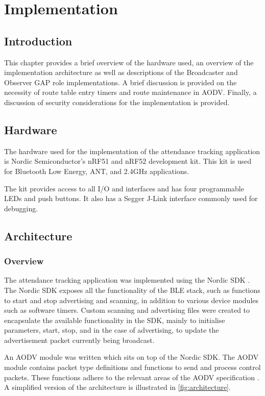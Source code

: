 \chapter{Implementation}

    \section{Introduction}
    This chapter provides a brief overview of the hardware used, an overview of
    the implementation architecture as well as descriptions of the Broadcaster
    and Observer GAP role implementations. A brief discussion is provided on the
    necessity of route table entry timers and route maintenance in AODV. Finally,
    a discussion of security considerations for the implementation is provided.

    \section{Hardware}
    The hardware used for the implementation of the attendance tracking application
    is Nordic Semiconductor's nRF51 and nRF52 development kit. This kit is used
    for Bluetooth Low Energy, ANT, and 2.4GHz applications.

    The kit provides access to all I/O and interfaces and has four programmable
    LEDs and push buttons. It also has a Segger J-Link interface commonly used
    for debugging.

    \section{Architecture}
        \subsection{Overview}
    The attendance tracking application was implemented using the Nordic SDK \cite{nordic_sdk}.
    The Nordic SDK exposes all the functionality of the BLE stack, such as functions
    to start and stop advertising and scanning, in addition to various device modules
    such as software timers. Custom scanning and advertising files were created
    to encapsulate the available functionality in the SDK, mainly to initialise
    parameters, start, stop, and in the case of advertising, to update the advertisement
    packet currently being broadcast.

    An AODV module was written which sits on top of the Nordic SDK. The AODV module
    contains packet type definitions and functions to send and process control
    packets. These functions adhere to the relevant areas of the AODV specification
    \cite{RFC3561}. A simplified version of the architecture is illustrated in
    \ref{fig:architecture}.

